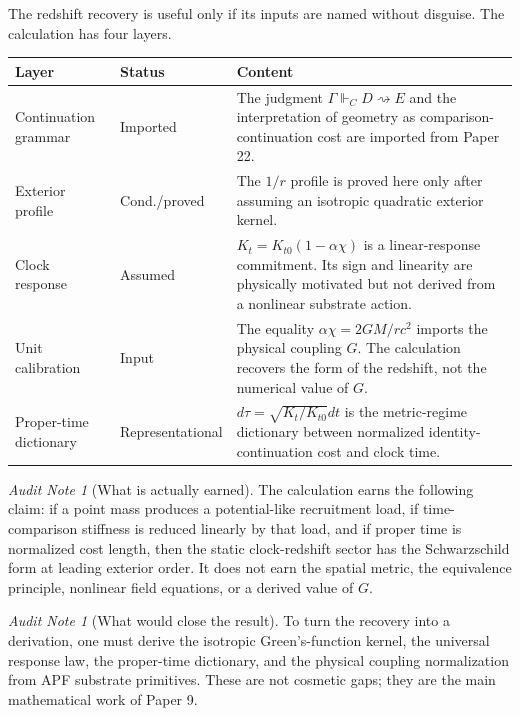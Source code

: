 \documentclass[11pt]{article}
\theoremstyle{remark}
\newtheorem{audit}[theorem]{Audit Note}
\newcommand{\G}{\Gamma}
\newcommand{\entails}{\Vdash}
\newcommand{\goes}{\rightsquigarrow}
\newcommand{\Status}[1]{\textsf{#1}}
\begin{document}
The redshift recovery is useful only if its inputs are named without disguise.  The calculation has four layers.

\begin{longtable}{p{}p{}p{}}
\toprule
Layer & Status & Content \\
\midrule
Continuation grammar & \Status{Imported} & The judgment \(\G\entails_C D\goes E\) and the interpretation of geometry as comparison-continuation cost are imported from Paper 22. \\
Exterior profile & \Status{Cond./proved} & The \(1/r\) profile is proved here only after assuming an isotropic quadratic exterior kernel. \\
Clock response & \Status{Assumed} & \(K_t=K_{t0}(1-\alpha\chi)\) is a linear-response commitment. Its sign and linearity are physically motivated but not derived from a nonlinear substrate action. \\
Unit calibration & \Status{Input} & The equality \(\alpha\chi=2GM/rc^2\) imports the physical coupling \(G\). The calculation recovers the form of the redshift, not the numerical value of \(G\). \\
Proper-time dictionary & \Status{Representational} & \(d\tau=\sqrt{K_t/K_{t0}}dt\) is the metric-regime dictionary between normalized identity-continuation cost and clock time. \\
\bottomrule
\end{longtable}

\begin{audit}[What is actually earned]
The calculation earns the following claim: if a point mass produces a potential-like recruitment load, if time-comparison stiffness is reduced linearly by that load, and if proper time is normalized cost length, then the static clock-redshift sector has the Schwarzschild form at leading exterior order.  It does not earn the spatial metric, the equivalence principle, nonlinear field equations, or a derived value of \(G\).
\end{audit}

\begin{audit}[What would close the result]
To turn the recovery into a derivation, one must derive the isotropic Green's-function kernel, the universal response law, the proper-time dictionary, and the physical coupling normalization from APF substrate primitives.  These are not cosmetic gaps; they are the main mathematical work of Paper 9.
\end{audit}
\end{document}
